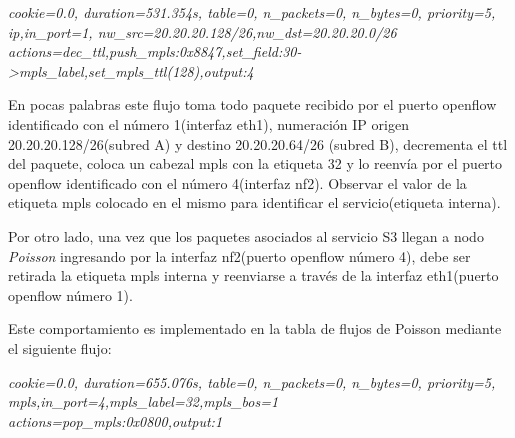 
\begin{center}
\textit{cookie=0.0, duration=531.354s, table=0, n\_packets=0, n\_bytes=0, priority=5, \\
ip,in\_port=1, nw\_src=20.20.20.128/26,nw\_dst=20.20.20.0/26 \\
actions=dec\_ttl,push\_mpls:0x8847,set\_field:30->mpls\_label,set\_mpls\_ttl(128),output:4}
\label{lst:flows1}
\end{center}

En pocas palabras este flujo toma todo paquete recibido por el puerto openflow identificado con el n\'umero 1(interfaz eth1), numeración IP origen 20.20.20.128/26(subred A) y destino 20.20.20.64/26 (subred B), decrementa el ttl del paquete, coloca un cabezal mpls con la etiqueta 32 y lo reenvía por el puerto openflow identificado con el n\'umero 4(interfaz nf2). Observar el valor de la etiqueta mpls colocado en el mismo para identificar el servicio(etiqueta interna). 


Por otro lado, una vez que los paquetes asociados al servicio S3 llegan a nodo \textit{Poisson} ingresando por la interfaz nf2(puerto openflow n\'umero 4), debe ser retirada la etiqueta mpls interna y reenviarse a través de la interfaz eth1(puerto openflow n\'umero 1).

Este comportamiento es implementado en la tabla de flujos de Poisson mediante el siguiente flujo:

\begin{center}
\textit{cookie=0.0, duration=655.076s, table=0, n\_packets=0, n\_bytes=0, priority=5, \\
mpls,in\_port=4,mpls\_label=32,mpls\_bos=1 \\
actions=pop\_mpls:0x0800,output:1 }
\end{center}

